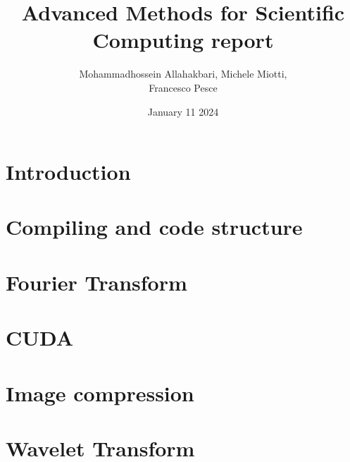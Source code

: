 \documentclass{article}
\title{Advanced Methods for Scientific Computing report}
\author{Mohammadhossein Allahakbari, Michele Miotti, \\Francesco Pesce}
\date{January 11 2024}
\begin{document}
\maketitle


\section{Introduction}
	

\section{Compiling and code structure}
	

\section{Fourier Transform}
	 

\section{CUDA}
	 

\section{Image compression}
	 

\section{Wavelet Transform}\label{sec:wavelet}
	 




\end{document}

